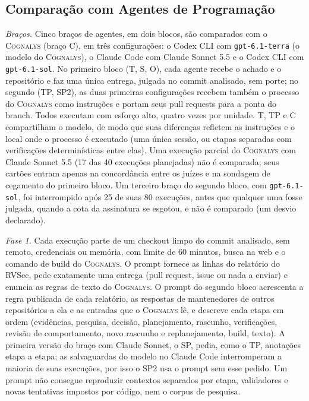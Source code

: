 \documentclass[conference]{IEEEtran}
\newcommand{\system}{\textsc{Cognalys}}
\begin{document}
\subsection{Comparação com Agentes de Programação}
\label{subsec:protocol}

\emph{Braços.} Cinco braços de agentes, em dois blocos, são comparados com o {\system} (braço
C), em três configurações: o Codex CLI com \texttt{gpt-6.1-terra}
(o modelo do {\system}), o Claude Code com Claude Sonnet 5.5 e o Codex CLI
com \texttt{gpt-6.1-sol}. No primeiro bloco (T, S, O), cada agente recebe
o achado e o repositório e faz uma única entrega, julgada no commit analisado,
sem porte; no segundo (TP, SP2), as duas primeiras configurações
recebem também o processo do {\system} como instruções e portam seus pull requests
para a ponta do branch. Todos executam com esforço alto, quatro vezes por unidade. T, TP e C
compartilham o modelo, de modo que suas diferenças refletem as instruções e o local onde o
processo é executado (uma única sessão, ou etapas separadas com verificações determinísticas
entre elas). Uma execução parcial do {\system} com Claude Sonnet 5.5 (17 das 40
execuções planejadas) não é comparada; seus cartões entram apenas na concordância
entre os juízes e na sondagem de cegamento do primeiro bloco.
Um terceiro braço do segundo bloco, com \texttt{gpt-6.1-sol}, foi interrompido após 25 de
suas 80 execuções, antes que qualquer uma fosse julgada, quando a cota da assinatura se esgotou,
e não é comparado (um desvio declarado).

\emph{Fase 1.} Cada execução parte de um checkout limpo do commit analisado,
sem remoto, credenciais ou memória, com limite de 60 minutos, busca na web
e o comando de build do {\system}. O prompt fornece as linhas do relatório do RVSec, pede
exatamente uma entrega (pull request, issue ou nada a enviar) e enuncia
as regras de texto do {\system}. O prompt do segundo bloco acrescenta a regra publicada
de cada relatório, as respostas de mantenedores de outros repositórios a ela e as entradas que o {\system}
lê, e descreve cada etapa em ordem (evidências, pesquisa, decisão,
planejamento, rascunho, verificações, revisão de comportamento, novo rascunho e replanejamento, build,
texto). A primeira versão do braço com Claude Sonnet, o SP, pedia, como o TP,
anotações etapa a etapa; as salvaguardas do modelo no Claude Code interromperam a
maioria de suas execuções, por isso o SP2 usa o prompt sem esse pedido. Um prompt
não consegue reproduzir contextos separados por etapa, validadores e
novas tentativas impostos por código, nem o corpus de pesquisa.
\end{document}
